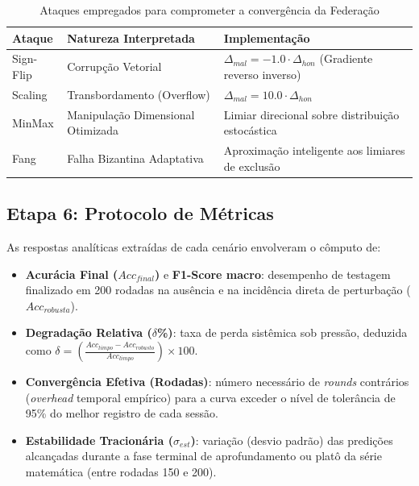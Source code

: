 \begin{table}[H]
\centering
\caption{Ataques empregados para comprometer a convergência da Federação}
\label{tab:ataques}
\footnotesize
\setlength{\tabcolsep}{3pt}
\begin{tabular}{@{}lll@{}}
\toprule
\textbf{Ataque} & \textbf{Natureza Interpretada} & \textbf{Implementação} \\
\midrule
Sign-Flip \cite{Allen2020} & Corrupção Vetorial & $\Delta_{mal} = -1.0 \cdot \Delta_{hon}$ (Gradiente reverso inverso) \\
Scaling \cite{Fang2025} & Transbordamento (Overflow) & $\Delta_{mal} = 10.0 \cdot \Delta_{hon}$ \\
MinMax \cite{Shejwalkar2021} & Manipulação Dimensional Otimizada & Limiar direcional sobre distribuição estocástica \\
Fang \cite{Fang2025} & Falha Bizantina Adaptativa & Aproximação inteligente aos limiares de exclusão \\
\bottomrule
\end{tabular}
\end{table}

\subsection{Etapa 6: Protocolo de Métricas}

As respostas analíticas extraídas de cada cenário envolveram o cômputo de:

\begin{itemize}
    \item \textbf{Acurácia Final ($Acc_{final}$)} e \textbf{F1-Score macro}: desempenho de testagem finalizado em 200 rodadas na ausência e na incidência direta de perturbação ($Acc_{robusta}$).
    \item \textbf{Degradação Relativa ($\delta$\%)}: taxa de perda sistêmica sob pressão, deduzida como $\delta = \left(\frac{Acc_{limpo} - Acc_{robusto}}{Acc_{limpo}}\right) \times 100$.
    \item \textbf{Convergência Efetiva (Rodadas)}: número necessário de \textit{rounds} contrários (\textit{overhead} temporal empírico) para a curva exceder o nível de tolerância de 95\% do melhor registro de cada sessão.
    \item \textbf{Estabilidade Tracionária ($\sigma_{est}$)}: variação (desvio padrão) das predições alcançadas durante a fase terminal de aprofundamento ou platô da série matemática (entre rodadas 150 e 200).
\end{itemize}

